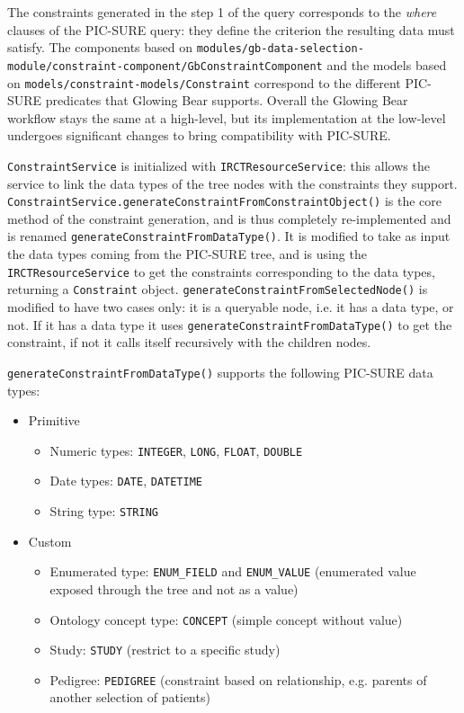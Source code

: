 The constraints generated in the step 1 of the query corresponds to the \emph{where} clauses of the PIC-SURE query: they define the criterion the resulting data must satisfy.
The components based on \verb|modules/gb-data-selection-module/constraint-component/GbConstraintComponent| and the models based on \verb|models/constraint-models/Constraint| correspond to the different PIC-SURE predicates that Glowing Bear supports.
Overall the Glowing Bear workflow stays the same at a high-level, but its implementation at the low-level undergoes significant changes to bring compatibility with PIC-SURE.

\verb|ConstraintService| is initialized with \verb|IRCTResourceService|: this allows the service to link the data types of the tree nodes with the constraints they support. \\
\verb|ConstraintService.generateConstraintFromConstraintObject()| is the core method of the constraint generation, and is thus completely re-implemented and is renamed \verb|generateConstraintFromDataType()|.
It is modified to take as input the data types coming from the PIC-SURE tree, and is using the \verb|IRCTResourceService| to get the constraints corresponding to the data types, returning a \verb|Constraint| object.
\verb|generateConstraintFromSelectedNode()| is modified to have two cases only: it is a queryable node, i.e. it has a data type, or not. If it has a data type it uses \verb|generateConstraintFromDataType()| to get the constraint, if not it calls itself recursively with the children nodes.

\verb|generateConstraintFromDataType()| supports the following PIC-SURE data types:
\begin{itemize}
\item Primitive
    \begin{itemize}
        \item Numeric types: \verb|INTEGER|, \verb|LONG|, \verb|FLOAT|, \verb|DOUBLE|
        \item Date types: \verb|DATE|, \verb|DATETIME|
        \item String type: \verb|STRING|
    \end{itemize}

\item Custom
    \begin{itemize}
        \item Enumerated type: \verb|ENUM_FIELD| and \verb|ENUM_VALUE| (enumerated value exposed through the tree and not as a value)
        \item Ontology concept type: \verb|CONCEPT| (simple concept without value)
        \item Study: \verb|STUDY| (restrict to a specific study)
        \item Pedigree: \verb|PEDIGREE| (constraint based on relationship, e.g. parents of another selection of patients)
    \end{itemize}
\end{itemize}


